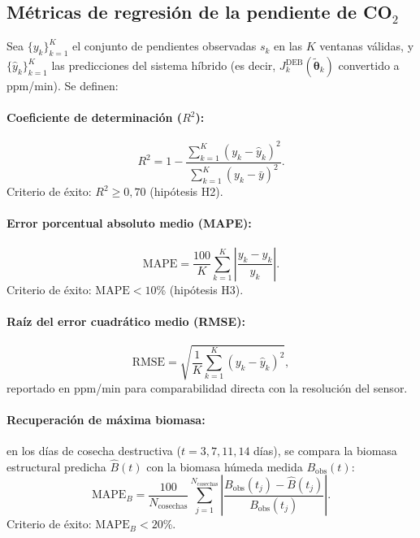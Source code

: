 \subsection{Métricas de regresión de la pendiente de CO$_2$}
\label{subsec:cap5_metricas_regresion}

Sea $\{y_k\}_{k=1}^{K}$ el conjunto de pendientes observadas $s_k$ en las $K$ ventanas válidas, y $\{\hat{y}_k\}_{k=1}^{K}$ las predicciones del sistema híbrido (es decir, $J_k^{\mathrm{DEB}}(\tilde{\boldsymbol{\theta}}_k)$ convertido a ppm/min). Se definen:

\paragraph{Coeficiente de determinación ($R^2$):}
\begin{equation}
R^2 = 1 - \frac{\sum_{k=1}^{K}(y_k - \hat{y}_k)^2}{\sum_{k=1}^{K}(y_k - \bar{y})^2}.
\label{eq:r2}
\end{equation}
Criterio de éxito: $R^2 \geq 0{,}70$ (hipótesis H2).

\paragraph{Error porcentual absoluto medio (MAPE):}
\begin{equation}
\mathrm{MAPE} = \frac{100}{K}\sum_{k=1}^{K}\left|\frac{y_k - \hat{y}_k}{y_k}\right|.
\label{eq:mape}
\end{equation}
Criterio de éxito: $\mathrm{MAPE} < 10$\% (hipótesis H3).

\paragraph{Raíz del error cuadrático medio (RMSE):}
\begin{equation}
\mathrm{RMSE} = \sqrt{\frac{1}{K}\sum_{k=1}^{K}(y_k - \hat{y}_k)^2},
\label{eq:rmse}
\end{equation}
reportado en ppm/min para comparabilidad directa con la resolución del sensor.

\paragraph{Recuperación de máxima biomasa:} en los días de cosecha destructiva ($t = 3, 7, 11, 14$ días), se compara la biomasa estructural predicha $\hat{B}(t)$ con la biomasa húmeda medida $B_{\mathrm{obs}}(t)$:
\begin{equation}
\mathrm{MAPE}_B = \frac{100}{N_{\mathrm{cosechas}}}\sum_{j=1}^{N_{\mathrm{cosechas}}}\left|\frac{B_{\mathrm{obs}}(t_j) - \hat{B}(t_j)}{B_{\mathrm{obs}}(t_j)}\right|.
\label{eq:mape_b}
\end{equation}
Criterio de éxito: $\mathrm{MAPE}_B < 20$\%.

